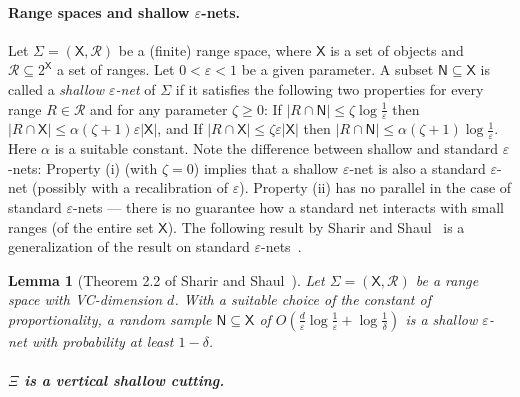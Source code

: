 \documentclass[11pt]{article}
\newif\ifsocgproc
\def\eps{{\varepsilon}}
\def\R{\mathcal{R}}
\def\XX{\mathsf{X}}
\def\NN{\mathsf{N}}
\newtheorem{lemma}[theorem]{Lemma}
\theoremstyle{definition}
\begin{document}
\paragraph{Range spaces and shallow $\eps$-nets.}
\fi
%
Let $\Sigma=(\XX,\R)$ be a (finite) range space, where $\XX$ is a set of objects and $\R \subseteq 2^\XX$ a set of ranges.
Let $0 < \eps < 1$ be a given parameter. A subset $\NN \subseteq \XX$ is called 
a \emph{shallow $\eps$-net} of $\Sigma$ if it satisfies the following two properties
for every range $R \in \R$ and for any parameter $\zeta \ge 0$:
%
\medskip
{}
If $|R\cap \NN| \le \zeta \log \frac{1}{\eps}$ then $|R\cap \XX| \le \alpha(\zeta + 1)\eps|\XX|$, and
%
\medskip
{}
If $|R\cap \XX| \le \zeta\eps|\XX|$ then $|R\cap \NN| \le \alpha(\zeta + 1) \log \frac{1}{\eps}$. 
%
\medskip
Here $\alpha$ is a suitable constant.
Note the difference between shallow and standard $\eps$-nets: Property (i) (with $\zeta = 0$) implies that
a shallow $\eps$-net is also a standard $\eps$-net (possibly with a recalibration of $\eps$). 
Property (ii) has no parallel in the case of standard $\eps$-nets --- there is no guarantee how 
a standard net interacts with small ranges (of the entire set $\XX$). The following result by 
Sharir and Shaul~\cite{ShSh} is a generalization of the result on standard $\eps$-nets~\cite{HW87}.
%
\begin{lemma}[Theorem 2.2 of Sharir and Shaul~]
	\label{lem:shallow-net}
Let $\Sigma=(\XX,\R)$ be a range space with VC-dimension $d$.
With a suitable choice of the constant of proportionality, a random sample $\NN \subseteq \XX$ of
${\displaystyle O\left(\frac{d}{\eps}\log\frac{1}{\eps} + \log\frac{1}{\delta}\right)}$
is a shallow $\eps$-net with probability at least $1 - \delta$.
\end{lemma}
%
\ifsocgproc 
\subparagraph*{$\Xi$ is a vertical shallow cutting.}
\else
\end{document}
